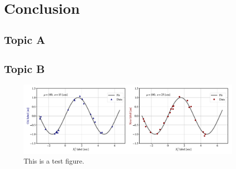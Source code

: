 \section{Conclusion}\label{section:conclusion}
\kant[5]

\subsection{Topic A}
\kant[10]

\subsection{Topic B}
\kant[10]


\kant[11]

\begin{figure}[h]\label{fig:test_sidebyside}
\begin{center}
\includegraphics[width=\textwidth]{figures/test_sidebyside.pdf}
\end{center}
\caption{This is a test figure.}
\end{figure}

\kant[12-13]
